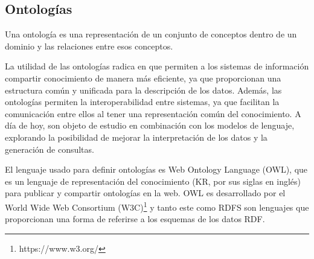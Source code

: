\subsection{Ontologías}
Una ontología es una representación de un conjunto de conceptos dentro de un dominio y las relaciones entre esos conceptos. 

La utilidad de las ontologías radica en que permiten a los sistemas de información compartir conocimiento de manera más eficiente, ya que proporcionan una estructura común y unificada para la descripción de los datos. Además, las ontologías permiten la interoperabilidad entre sistemas, ya que facilitan la comunicación entre ellos al tener una representación común del conocimiento. A día de hoy, son objeto de estudio en combinación con los modelos de lenguaje, explorando la posibilidad de mejorar la interpretación de los datos y la generación de consultas.

El lenguaje usado para definir ontologías es Web Ontology Language (OWL), que es un lenguaje de representación del conocimiento (KR, por sus siglas en inglés) para publicar y compartir ontologías en la web. OWL es desarrollado por el World Wide Web Consortium (W3C)\footnote{https://www.w3.org/} y tanto este como RDFS son lenguajes que proporcionan una forma de referirse a los esquemas de los datos RDF.

